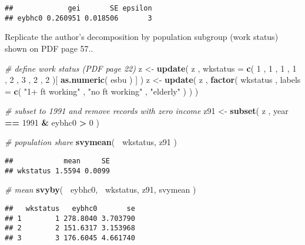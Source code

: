 \documentclass[]{book}
\newenvironment{Shaded}{\begin{snugshade}}{\end{snugshade}}
\newcommand{\CommentTok}[1]{\textcolor[rgb]{0.56,0.35,0.01}{\textit{#1}}}
\newcommand{\DataTypeTok}[1]{\textcolor[rgb]{0.13,0.29,0.53}{#1}}
\newcommand{\DecValTok}[1]{\textcolor[rgb]{0.00,0.00,0.81}{#1}}
\newcommand{\KeywordTok}[1]{\textcolor[rgb]{0.13,0.29,0.53}{\textbf{#1}}}
\newcommand{\NormalTok}[1]{#1}
\newcommand{\OperatorTok}[1]{\textcolor[rgb]{0.81,0.36,0.00}{\textbf{#1}}}
\newcommand{\StringTok}[1]{\textcolor[rgb]{0.31,0.60,0.02}{#1}}
\begin{document}
\begin{verbatim}
##             gei       SE epsilon
## eybhc0 0.260951 0.018506       3
\end{verbatim}

Replicate the author's decomposition by population subgroup (work status) shown on PDF page 57..

\begin{Shaded}
\begin{Highlighting}[]
\CommentTok{# define work status (PDF page 22)}
\NormalTok{z <-}\StringTok{ }\KeywordTok{update}\NormalTok{( z , }\DataTypeTok{wkstatus =} \KeywordTok{c}\NormalTok{( }\DecValTok{1}\NormalTok{ , }\DecValTok{1}\NormalTok{ , }\DecValTok{1}\NormalTok{ , }\DecValTok{1}\NormalTok{ , }\DecValTok{2}\NormalTok{ , }\DecValTok{3}\NormalTok{ , }\DecValTok{2}\NormalTok{ , }\DecValTok{2}\NormalTok{ )[ }\KeywordTok{as.numeric}\NormalTok{( esbu ) ] )}
\NormalTok{z <-}\StringTok{ }\KeywordTok{update}\NormalTok{( z , }\KeywordTok{factor}\NormalTok{( wkstatus , }\DataTypeTok{labels =} \KeywordTok{c}\NormalTok{( }\StringTok{"1+ ft working"}\NormalTok{ , }\StringTok{"no ft working"}\NormalTok{ , }\StringTok{"elderly"}\NormalTok{ ) ) )}

\CommentTok{# subset to 1991 and remove records with zero income}
\NormalTok{z91 <-}\StringTok{ }\KeywordTok{subset}\NormalTok{( z , year }\OperatorTok{==}\StringTok{ }\DecValTok{1991} \OperatorTok{&}\StringTok{ }\NormalTok{eybhc0 }\OperatorTok{>}\StringTok{ }\DecValTok{0}\NormalTok{ )}

\CommentTok{# population share}
\KeywordTok{svymean}\NormalTok{( }\OperatorTok{~}\NormalTok{wkstatus, z91 )}
\end{Highlighting}
\end{Shaded}

\begin{verbatim}
##            mean     SE
## wkstatus 1.5594 0.0099
\end{verbatim}

\begin{Shaded}
\begin{Highlighting}[]
\CommentTok{# mean}
\KeywordTok{svyby}\NormalTok{( }\OperatorTok{~}\NormalTok{eybhc0, }\OperatorTok{~}\NormalTok{wkstatus, z91, svymean )}
\end{Highlighting}
\end{Shaded}

\begin{verbatim}
##   wkstatus   eybhc0       se
## 1        1 278.8040 3.703790
## 2        2 151.6317 3.153968
## 3        3 176.6045 4.661740
\end{verbatim}
\end{document}
